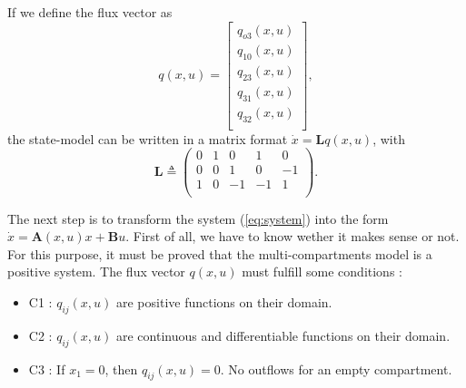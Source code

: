  If we define the flux vector as
 \begin{equation}
 q(x,u)=
 \begin{bmatrix}
 q_{o3}(x,u)\\
 q_{10}(x,u)\\
 q_{23}(x,u)\\
 q_{31}(x,u)\\
 q_{32}(x,u)\\
 \end{bmatrix},
\label{eq:fluxvector}
\end{equation}
 the state-model can be written in a matrix format $\dot{x}=\mathbf{L}q(x,u)$, with
 \begin{equation}
 \mathbf{L}\triangleq
 \begin{pmatrix}
 0 & 1 & 0 & 1 & 0\\
 0 & 0 & 1 & 0 & -1\\
 1 & 0 & -1 & -1 & 1\\
 \end{pmatrix} .
\label{eq:L}
\end{equation}

The next step is to transform the system (\ref{eq:system}) into the form $\dot{x}=\mathbf{A}(x,u)x+\mathbf{B}u$. First of all, we have to know wether it makes sense or not. For this purpose, it must be proved that the multi-compartments model is a positive system. The flux vector $q(x,u)$ must fulfill some conditions :
\begin{itemize}
\item C1 : $q_{ij}(x,u)$ are positive functions on their domain.
\item C2 : $q_{ij}(x,u)$ are continuous and differentiable functions on their domain.
\item C3 : If $x_1 =0$, then $q_{ij}(x,u)=0$. No outflows for an empty compartment.
\end{itemize}

